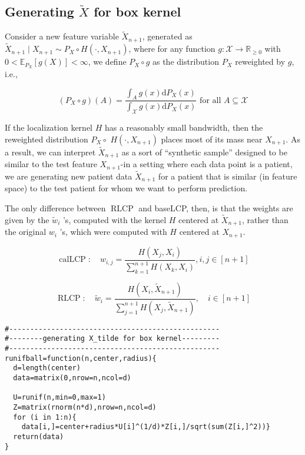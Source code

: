 \documentclass[UTF8, a4paper]{article}
\begin{document}
\subsection{Generating \(\tilde{X}\) for box kernel}

Consider {\color{blue}a new feature variable $\widetilde{X}_{n+1}$}, generated as $\widetilde{X}_{n+1} \mid X_{n+1} \sim P_X \circ H\left(\cdot, X_{n+1}\right)$, 
where for any function $g: \mathcal{X} \rightarrow \mathbb{R}_{\geq 0}$ with $0<\mathbb{E}_{P_X}[g(X)]<\infty$, we define $P_X \circ g$ as the distribution $P_X$ reweighted by $g$, i.e.,

$$
\left(P_X \circ g\right)(A)=\frac{\int_A g(x) \mathrm{d} P_X(x)}{\int_{\mathcal{X}} g(x) \mathrm{d} P_X(x)} \text { for all } A \subseteq \mathcal{X}
$$


If the localization kernel $H$ has a reasonably {\color{blue}small bandwidth}, 
then the reweighted distribution $P_X \circ$ $H\left(\cdot, X_{n+1}\right)$ {\color{blue}places most of its mass near $X_{n+1}$}. 
As a result, we can interpret $\widetilde{X}_{n+1}$ as a sort of ``synthetic sample'' designed to be similar to the test feature 
$X_{n+1}$-in a setting where each data point is a patient, we are generating new patient data $\widetilde{X}_{n+1}$ for a patient that is {\color{blue}similar} (in feature space) to the test patient for whom we want to {\color{blue}perform prediction}.

The only difference between ${\operatorname{RLCP}}$ and baseLCP, then, is that the {\color{blue}weights} are given by the $\widetilde{w}_i$ 's, computed with the kernel $H$ centered at $\widetilde{X}_{n+1}$, rather than the original $w_i$ 's, which were computed with $H$ centered at $X_{n+1}$.

$$
{\operatorname{calLCP}}: \quad w_{i, j}=\frac{H\left(X_j, X_i\right)}{\sum_{k=1}^{n+1} H\left(X_k, X_i\right)}, i, j \in[n+1]
$$

$$
{\operatorname{RLCP}}: \quad \widetilde{w}_i=\frac{H\left(X_i, \widetilde{X}_{n+1}\right)}{\sum_{j=1}^{n+1} H\left(X_j, \widetilde{X}_{n+1}\right)}, \quad i \in[n+1]
$$


\begin{verbatim}
#--------------------------------------------------
#--------generating X_tilde for box kernel---------
#--------------------------------------------------
runifball=function(n,center,radius){
  d=length(center)
  data=matrix(0,nrow=n,ncol=d)
  
  U=runif(n,min=0,max=1)
  Z=matrix(rnorm(n*d),nrow=n,ncol=d)
  for (i in 1:n){
    data[i,]=center+radius*U[i]^(1/d)*Z[i,]/sqrt(sum(Z[i,]^2))}
  return(data)
}
\end{verbatim}
\end{document}
